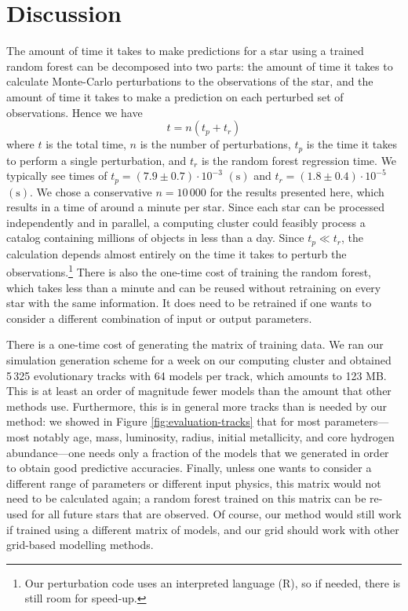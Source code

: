 \documentclass[twocolumn,twocolappendix]{aastex6}
\begin{document}
\section{Discussion}
The amount of time it takes to make predictions for a star using a trained random forest can be decomposed into two parts: the amount of time it takes to calculate Monte-Carlo perturbations to the observations of the star, and the amount of time it takes to make a prediction on each perturbed set of observations. Hence we have
\begin{equation}
    t = n(t_p + t_r)
\end{equation}
where $t$ is the total time, $n$ is the number of perturbations, $t_p$ is the time it takes to perform a single perturbation, and $t_r$ is the random forest regression time. We typically see times of $t_p = (7.9 \pm 0.7) \cdot 10^{-3}$ $(\si{\s})$ and $t_r = (1.8 \pm 0.4) \cdot 10^{-5}$ $(\si{\s})$. We chose a conservative $n=10\,000$ for the results presented here, which results in a time of around a minute per star. Since each star can be processed independently and in parallel, a computing cluster could feasibly process a catalog containing millions of objects in less than a day. Since $t_p \ll t_r$, the calculation depends almost entirely on the time it takes to perturb the observations.\footnote{Our perturbation code uses an interpreted language (R), so if needed, there is still room for speed-up.} There is also the one-time cost of training the random forest, which takes less than a minute and can be reused without retraining on every star with the same information. It does need to be retrained if one wants to consider a different combination of input or output parameters. 

There is a one-time cost of generating the matrix of training data. We ran our simulation generation scheme for a week on our computing cluster and obtained 5\,325 evolutionary tracks with 64 models per track, which amounts to 123 MB. This is at least an order of magnitude fewer models than the amount that other methods use. Furthermore, this is in general more tracks than is needed by our method: we showed in Figure \ref{fig:evaluation-tracks} that for most parameters---most notably age, mass, luminosity, radius, initial metallicity, and core hydrogen abundance---one needs only a fraction of the models that we generated in order to obtain good predictive accuracies. Finally, unless one wants to consider a different range of parameters or different input physics, this matrix would not need to be calculated again; a random forest trained on this matrix can be re-used for all future stars that are observed. Of course, our method would still work if trained using a different matrix of models, and our grid should work with other grid-based modelling methods. 
\end{document}
